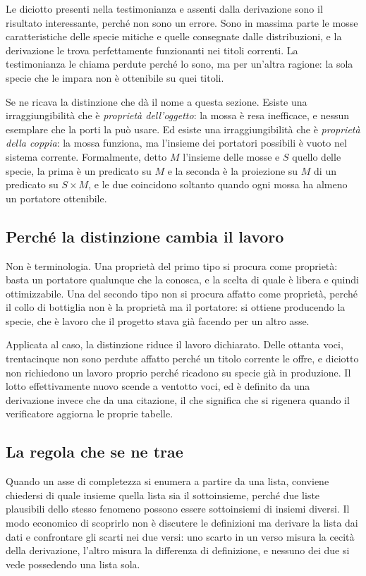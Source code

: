 Le diciotto presenti nella testimonianza e assenti dalla derivazione sono il risultato interessante, perché non sono un errore. Sono in massima parte le mosse caratteristiche delle specie mitiche e quelle consegnate dalle distribuzioni, e la derivazione le trova perfettamente funzionanti nei titoli correnti. La testimonianza le chiama perdute perché lo sono, ma per un'altra ragione: la sola specie che le impara non è ottenibile su quei titoli.

Se ne ricava la distinzione che dà il nome a questa sezione. Esiste una irraggiungibilità che è \emph{proprietà dell'oggetto}: la mossa è resa inefficace, e nessun esemplare che la porti la può usare. Ed esiste una irraggiungibilità che è \emph{proprietà della coppia}: la mossa funziona, ma l'insieme dei portatori possibili è vuoto nel sistema corrente. Formalmente, detto $M$ l'insieme delle mosse e $S$ quello delle specie, la prima è un predicato su $M$ e la seconda è la proiezione su $M$ di un predicato su $S \times M$, e le due coincidono soltanto quando ogni mossa ha almeno un portatore ottenibile.

\subsection{Perché la distinzione cambia il lavoro}

Non è terminologia. Una proprietà del primo tipo si procura come proprietà: basta un portatore qualunque che la conosca, e la scelta di quale è libera e quindi ottimizzabile. Una del secondo tipo non si procura affatto come proprietà, perché il collo di bottiglia non è la proprietà ma il portatore: si ottiene producendo la specie, che è lavoro che il progetto stava già facendo per un altro asse.

Applicata al caso, la distinzione riduce il lavoro dichiarato. Delle ottanta voci, trentacinque non sono perdute affatto perché un titolo corrente le offre, e diciotto non richiedono un lavoro proprio perché ricadono su specie già in produzione. Il lotto effettivamente nuovo scende a ventotto voci, ed è definito da una derivazione invece che da una citazione, il che significa che si rigenera quando il verificatore aggiorna le proprie tabelle.

\subsection{La regola che se ne trae}

Quando un asse di completezza si enumera a partire da una lista, conviene chiedersi di quale insieme quella lista sia il sottoinsieme, perché due liste plausibili dello stesso fenomeno possono essere sottoinsiemi di insiemi diversi. Il modo economico di scoprirlo non è discutere le definizioni ma derivare la lista dai dati e confrontare gli scarti nei due versi: uno scarto in un verso misura la cecità della derivazione, l'altro misura la differenza di definizione, e nessuno dei due si vede possedendo una lista sola.

